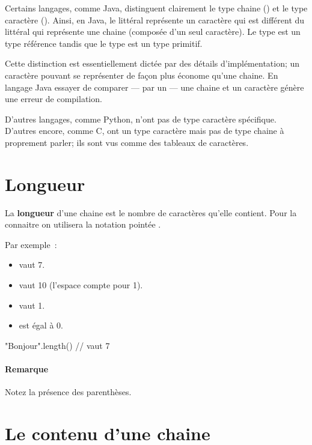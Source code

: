 	Certains langages, comme Java, distinguent clairement le type chaine
	() et le type caractère ().  Ainsi, en
	Java, le littéral  représente un caractère qui est différent du
	littéral  qui représente une chaine (composée d’un seul caractère).
	Le type  est un type référence tandis que le type  est
	un type primitif. 

	Cette distinction est essentiellement dictée par des détails
	d’implémentation; un caractère pouvant se représenter de façon plus économe
	qu’une chaine. En langage Java essayer de comparer — par un
	 —  une chaine et un caractère génère une erreur de
	compilation. 

	D’autres langages, comme Python, n’ont pas de type caractère spécifique.
	D’autres encore, comme C, ont un type caractère mais pas de type chaine
	à proprement parler; ils sont vus comme des tableaux de caractères. 


\section{Longueur}
	
	 La \textbf{longueur}
	d’une chaine est le nombre de caractères qu’elle contient.  Pour la
	connaitre on utilisera la notation pointée .
	
	Par exemple~:

	\begin{itemize}
	\item {} vaut 7.
	\item {} vaut 10 (l’espace compte pour 1).
	\item {} vaut 1.
	\item {} est égal à 0.
	\end{itemize}

	\begin{java}
"Bonjour".length() // vaut 7		
	\end{java}

	\paragraph{Remarque}
	Notez la présence des parenthèses.

	
	
\section{Le contenu d’une chaine}


